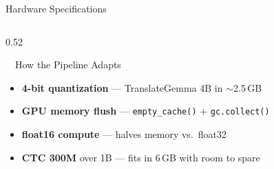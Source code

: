 \documentclass[aspectratio=169, 11pt]{beamer}
\begin{document}
\begin{frame}{Hardware Specifications}
\begin{columns}[T]
\begin{column}{0.52\textwidth}
\begin{block}{\faCogs\ \ How the Pipeline Adapts}
\begin{itemize}
                    \item[\faCompressArrowsAlt] \textbf{4-bit quantization} --- TranslateGemma 4B in $\sim$2.5\,GB
                    \item[\faLayerGroup] \textbf{GPU memory flush} --- \texttt{empty\_cache()} + \texttt{gc.collect()}
                    \item[\faRulerHorizontal] \textbf{float16 compute} --- halves memory vs.\ float32
                    \item[\faCubes] \textbf{CTC 300M} over 1B --- fits in 6\,GB with room to spare
                \end{itemize}
            \end{block}
        \end{column}
    \end{columns}
\end{frame}
\end{document}
